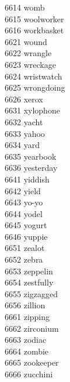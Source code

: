 6614 womb \\
6615 woolworker \\
6616 workbasket \\
6621 wound \\
6622 wrangle \\
6623 wreckage \\
6624 wristwatch \\
6625 wrongdoing \\
6626 xerox \\
6631 xylophone \\
6632 yacht \\
6633 yahoo \\
6634 yard \\
6635 yearbook \\
6636 yesterday \\
6641 yiddish \\
6642 yield \\
6643 yo-yo \\
6644 yodel \\
6645 yogurt \\
6646 yuppie \\
6651 zealot \\
6652 zebra \\
6653 zeppelin \\
6654 zestfully \\
6655 zigzagged \\
6656 zillion \\
6661 zipping \\
6662 zirconium \\
6663 zodiac \\
6664 zombie \\
6665 zookeeper \\
6666 zucchini \\
